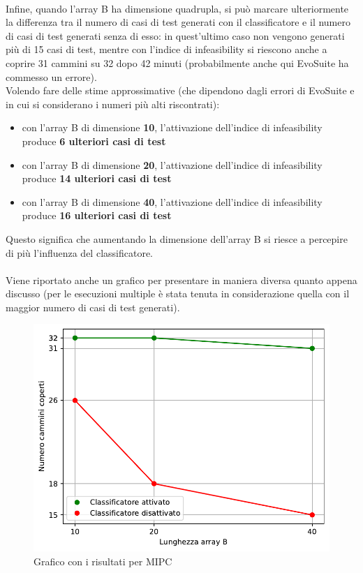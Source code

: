 \documentclass[a4paper, 12pt, oneside]{book}
\theoremstyle{normal}
\begin{document}
\\ Infine, quando l'array B ha dimensione quadrupla, si può marcare ulteriormente la differenza tra il numero di casi di test generati con il classificatore e il numero di casi di test generati senza di esso: in quest'ultimo caso non vengono generati più di 15 casi di test, mentre con l'indice di infeasibility si riescono anche a coprire 31 cammini su 32 dopo 42 minuti (probabilmente anche qui EvoSuite ha commesso un errore).
\\ Volendo fare delle stime approssimative (che dipendono dagli errori di EvoSuite e in cui si considerano i numeri più alti riscontrati):
\begin{itemize}[itemsep=0pt, topsep=2pt]
    \item con l'array B di dimensione \textbf{10}, l'attivazione dell'indice di infeasibility produce \textbf{6 ulteriori casi di test}
    \item con l'array B di dimensione \textbf{20}, l'attivazione dell'indice di infeasibility produce \textbf{14 ulteriori casi di test}
    \item con l'array B di dimensione \textbf{40}, l'attivazione dell'indice di infeasibility produce \textbf{16 ulteriori casi di test}
\end{itemize}
Questo significa che aumentando la dimensione dell'array B si riesce a percepire di più l'influenza del classificatore.
\\ \\ Viene riportato anche un grafico per presentare in maniera diversa quanto appena discusso (per le esecuzioni multiple è stata tenuta in considerazione quella con il maggior numero di casi di test generati).
\begin{figure}[h]
  \centering
  \includegraphics[width=\textwidth]{img/plot.pdf}
  \caption{Grafico con i risultati per MIPC}
  \label{diagram:plot-mipc}
\end{figure}
\end{document}
